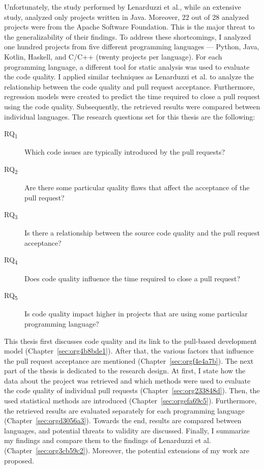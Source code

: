 \documentclass[digital,oneside,oldtable,nolof,nolot,nocover]{fithesis4}
\begin{document}
Unfortunately, the study performed by Lenarduzzi et al., while an extensive
study, analyzed only projects written in Java. Moreover, 22 out of 28 analyzed
projects were from the Apache Software Foundation. This is the major threat to
the generalizability of their findings. To address these shortcomings, I
analyzed one hundred projects from five different programming languages ---
Python, Java, Kotlin, Haskell, and C/C++ (twenty projects per language). For
each programming language, a different tool for static analysis was used to
evaluate the code quality. I applied similar techniques as Lenarduzzi et
al. to analyze the relationship between the code quality and pull request
acceptance. Furthermore, regression models were created to predict the
time required to close a pull request using the code quality. Subsequently,
the retrieved results were compared between individual languages.
\newpage{}
\noindent{}The research questions set for this thesis are the following:
\begin{description}
\item[{RQ\textsubscript{1}}] Which code issues are typically introduced by the pull requests?
\item[{RQ\textsubscript{2}}] Are there some particular quality flaws that affect the acceptance of the pull request?
\item[{RQ\textsubscript{3}}] Is there a relationship between the source code quality and the pull request acceptance?
\item[{RQ\textsubscript{4}}] Does code quality influence the time required to close a pull request?
\item[{RQ\textsubscript{5}}] Is code quality impact higher in projects that are using some particular programming language?
\end{description}

This thesis first discusses code quality and its link to the pull-based
development model (Chapter~\ref{sec:org4b8bde1}).
After that, the various factors that influence the pull request acceptance are
mentioned (Chapter~\ref{sec:orgf4e4a7b}). The next part of the thesis
is dedicated to the research design. At first, I state how the data about the
project was retrieved and which methods were used to evaluate the code quality
of individual pull requests (Chapter~\ref{sec:org233848d}). Then, the used
statistical methods are introduced (Chapter~\ref{sec:orgefa69c5}). Furthermore,
the retrieved results are evaluated separately for each programming language
(Chapter~\ref{sec:orgd3056a3}). Towards the end, results are compared between
languages, and potential threats to validity are discussed. Finally, I
summarize my findings and compare them to the findings of Lenarduzzi et al.
(Chapter~\ref{sec:org3cb59c2}). Moreover, the potential extensions of my work are
proposed.
\end{document}
